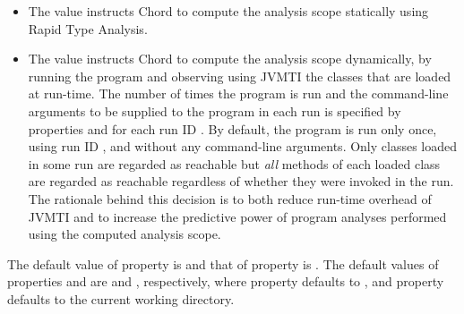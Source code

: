 \begin{itemize}
\begin{itemize}
\item
The  value instructs Chord to compute the analysis scope statically using Rapid Type Analysis.
\item
The  value instructs Chord to compute the analysis scope dynamically, by running the program
and observing using JVMTI the classes that are loaded at run-time.
The number of times the program is run and the command-line arguments to be supplied to
the program in each run is specified by properties  and
 for each run ID .  By default, the program is run only once, using run ID ,
and without any command-line arguments.
Only classes loaded in some run are regarded as reachable but {\it all} methods of each loaded class are regarded
as reachable regardless of whether they were invoked in the run.
The rationale behind this decision is to both reduce run-time overhead of JVMTI and to increase the
predictive power of program analyses performed using the computed analysis scope.
\end{itemize}
\end{itemize}

The default value of property  is  and that of
property  is .
The default values of properties  and  are
 and , respectively,
where property  defaults to ,
and property  defaults to the current working directory.

